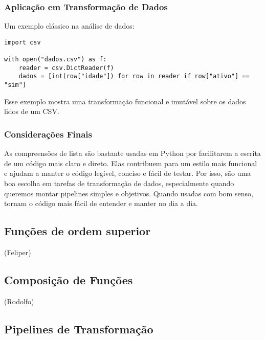 \documentclass[date,twocolumn,a4paper]{ppgem}
\begin{document}
\subsubsection{Aplicação em Transformação de Dados}
Um exemplo clássico na análise de dados:

\begin{verbatim}
import csv

with open("dados.csv") as f:
    reader = csv.DictReader(f)
    dados = [int(row["idade"]) for row in reader if row["ativo"] == "sim"]
\end{verbatim}

Esse exemplo mostra uma transformação funcional e imutável sobre os dados lidos de um CSV.

\subsubsection{Considerações Finais}
As compreensões de lista são bastante usadas em Python por facilitarem a escrita de um código mais claro e direto. Elas contribuem para um estilo mais funcional e ajudam a manter o código legível, conciso e fácil de testar. Por isso, são uma boa escolha em tarefas de transformação de dados, especialmente quando queremos montar pipelines simples e objetivos. Quando usadas com bom senso, tornam o código mais fácil de entender e manter no dia a dia.


\subsection{Funções de ordem superior}
(Feliper)
\subsection{Composição de Funções}
(Rodolfo)
\subsection{Pipelines de Transformação}
\end{document}

